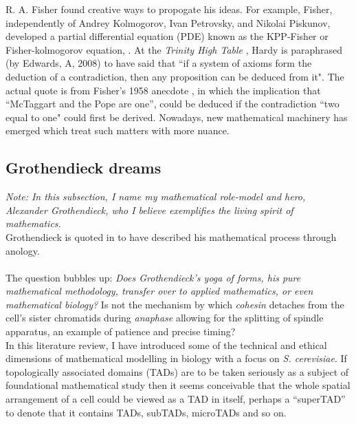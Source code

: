R. A. Fisher found creative ways to propogate his ideas. 
For example, Fisher, independently of Andrey Kolmogorov, Ivan Petrovsky, and Nikolai Piskunov,
developed a partial differential equation (PDE) known as the KPP-Fisher or
Fisher-kolmogorov equation, \cite{fisher1937wave}. At the \textit{Trinity High Table}
, Hardy is paraphrased (by Edwards, A, 2008) to have said that ``if a system of axioms 
form the deduction of a contradiction, then any proposition can be deduced from it".
The actual quote is from Fisher's 1958 anecdote \cite{edwards2008gh}, 
in which the implication that ``McTaggart and the Pope are one'', 
could be deduced if the contradiction ``two equal to one" could first be derived. 
Nowadays, new mathematical machinery has emerged which 
treat such matters with more nuance.
\\

\subsection{Grothendieck dreams}

\textit{Note: In this subsection, I name my mathematical role-model and hero, \\
Alexander Grothendieck, who I believe exemplifies the living spirit of mathematics.}
\\

Grothendieck is quoted in \cite{mclarty2007rising} to have described 
his mathematical process through anology.
\\

\\

The question bubbles up: \textit{Does Grothendieck's \textit{yoga} of forms, 
his pure mathematical methodology,
transfer over to applied mathematics, or even mathematical biology?}
Is not the mechanism by which \textit{cohesin} detaches from the cell's sister 
chromatids during \textit{anaphase} allowing for the splitting of 
spindle apparatus, an example of patience and precise timing?
\\

In this literature review, I have introduced some of the technical 
and ethical dimensions of mathematical modelling in biology with a focus
on \textit{S. cerevisiae}. If topologically associated domains (TADs)
are to be taken seriously as a subject of foundational mathematical study then it 
seems conceivable that the whole spatial arrangement of a cell could 
be viewed as a TAD in itself, perhaps a ``superTAD'' to denote 
that it contains TADs, subTADs, microTADs and so on.
\\

